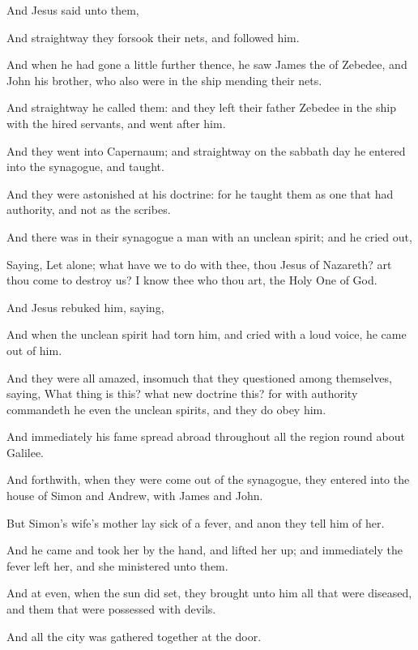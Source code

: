 {And
Jesus
said unto
them,
{}

And
straightway they
forsook
their
nets, and
followed
him.

And when he had
gone a little
further
thence, he
saw
James the
{} of
Zebedee,
and
John
his
brother,
who
also
were
in the
ship
mending their
nets.

And
straightway he
called
them:
and they
left
their
father
Zebedee
in the
ship
with the hired
servants, and
went
after
him.

And they
went
into
Capernaum;
and
straightway on the sabbath
day he
entered
into the
synagogue, and
taught.

And they were
astonished
at
his
doctrine:
for
he
taught
them
as one that
had
authority,
and
not
as the
scribes.

And there
was
in
their
synagogue a
man
with an
unclean
spirit;
and he cried
out,

Saying,
Let
{}
alone; what
have we to
do
with
thee, thou
Jesus of
Nazareth? art thou
come to
destroy
us? I
know
thee
who thou
art, the Holy
One of
God.

And
Jesus
rebuked
him,
saying,
{}

And
when the
unclean
spirit had
torn
him,
and
cried with a
loud
voice, he came
out
of
him.

And they
were
all
amazed, insomuch
that they
questioned
among
themselves,
saying,
What thing
is
this?
what
new
doctrine
{}
this?
for
with
authority commandeth
he
even the
unclean
spirits,
and they do
obey
him.

And
immediately
his
fame spread
abroad
throughout
all the region round
about
Galilee.

And
forthwith, when they were come
out
of the
synagogue, they
entered
into the
house of
Simon
and
Andrew,
with
James
and
John.

But
Simon’s
wife’s mother
lay sick of a
fever,
and
anon they
tell
him
of
her.

And he
came and
took
her by the
hand, and
lifted
her
up;
and
immediately the
fever
left
her,
and she
ministered unto
them.

And at
even,
when the
sun
did
set, they
brought
unto
him
all that
were
diseased,
and
them that were possessed with
devils.

And
all the
city
was gathered
together
at the
door.

}
